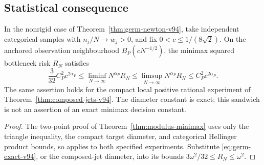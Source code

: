 \subsection{Statistical consequence}
\begin{corollary}
\label{cor:germ-risk-v94}
In the nonrigid case of Theorem~\ref{thm:germ-newton-v94}, take
independent categorical samples with $n_j/N\to w_j>0$, and fix
$0<c\le1/(8\sqrt2)$. On the anchored observation neighbourhood
$B_P(cN^{-1/2})$, the minimax squared bottleneck risk $R_N$ satisfies
\[
 \frac{3}{32}C_P^2c^{2\alpha_P}
 \le\liminf_{N\to\infty}N^{\alpha_P}R_N
 \le\limsup_{N\to\infty}N^{\alpha_P}R_N
 \le C_P^2c^{2\alpha_P}.
\]
The same assertion holds for the compact local positive rational
experiment of Theorem~\ref{thm:composed-jets-v94}. The diameter
constant is exact; this sandwich is not an assertion of an exact
minimax decision constant.
\end{corollary}
\begin{proof}
The two-point proof of Theorem~\ref{thm:modulus-minimax} uses only
the triangle inequality, the compact target diameter, and categorical
Hellinger product bounds, so applies to both specified experiments.
Substitute \eqref{eq:germ-exact-v94}, or the composed-jet diameter,
into its bounds $3\omega^2/32\le R_N\le\omega^2$.
\end{proof}

